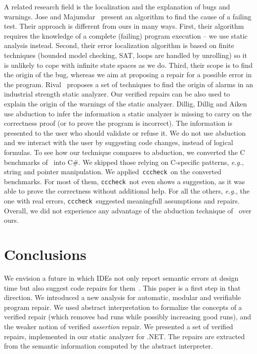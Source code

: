 \documentclass[10pt]{sigplanconf}
\newcommand{\code}[1]{\texttt{#1}}
\newcommand{\clousot}{\code{cccheck}}
\begin{document}
A related research field is the localization and the explanation of bugs and warnings.
Jose and Majumdar~\cite{JoseMajumdarPLDI11} present an algorithm to find the cause of a failing test.
Their approach is different from ours in many ways.
First, their algorithm requires the knowledge of a complete (failing) program execution -- we use static analysis instead.
Second, their error localization algorithm is based on finite techniques (bounded model checking, SAT, loops are handled by unrolling) so it is unlikely to cope with infinite state spaces as we do.
Third, their scope is to find the origin of the bug, whereas we aim at proposing a repair for a possible error in the program.
Rival~\cite{RivalSAS05} proposes a set of techniques to find the origin of alarms in an industrial strength static analyzer.
Our verified repairs can be also used to explain the origin of the warnings of the static analyzer.
Dillig, Dillig and Aiken~\cite{DilligDilligAiken-PLDI12} use abduction to infer the information a static analyzer is missing to carry on the correctness proof (or to prove the program is incorrect).
The information is presented to the user who should validate or refuse it.
We do not use abduction and we interact with the user by suggesting code changes, instead of logical formulas.
To see how our technique compares to abduction, we converted the C benchmarks of~\cite{DilligDilligAiken-PLDI12} into C\#.
We skipped those relying on C-specific patterns, \emph{e.g.}, string and pointer manipulation.
We applied~\clousot\ on the converted benchmarks.
For most of them, \clousot\ not even shows a suggestion, as it was able to prove the correctness without additional help.
For all the others, \emph{e.g.}, the one with real errors, \clousot\ suggested meaningfull assumptions and repairs.
Overall, we did not experience any advantage of the abduction technique of~\cite{DilligDilligAiken-PLDI12} over ours.


\section{Conclusions}
\label{sec:conclude}
We envision a future in which IDEs not only report semantic errors at design time but also suggest code repairs for them~\cite{LogozzoEtAlDemoOOPSLA12}.
This paper is a first step in that direction.
We introduced a new analysis for automatic, modular and verifiable
program repair.  We used abstract interpretation to formalize the
concepts of a verified repair (which removes bad runs while possibly
increasing good runs), and the weaker notion of verified
\emph{assertion} repair. We presented a set of verified repairs,
implemented in our static analyzer for .NET.  The repairs are
extracted from the semantic information computed by the abstract
interpreter.  
\end{document}
